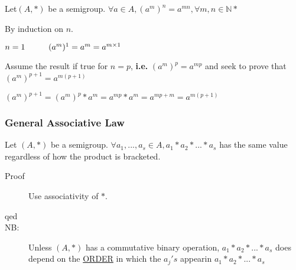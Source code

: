 \documentclass[10pt]{article}
\begin{document}
\begin{description}
\begin{description}
		\end{description}
		\item[Theorem:] Let$(A, *)$ be a semigroup. $\forall a \in A, (a^m)^n = a^{mn}, \forall m, n \in \mathbb{N}*$
		\begin{description}
			\item[Proof:] By induction on $n$.
			\item[Base Case:] $n=1 \hspace{10mm} (a^m)^1 = a^m = a^{m \times 1}$
			\item[Inductive Step:] Assume the result if true for $n=p$, \textbf{i.e.} $(a^m)^p = a^{mp}$ and seek to prove that $(a^m)^{p+1}=a^{m(p+1)}$
			\item $(a^m)^{p+1} = (a^m)^p * a^m = a^{mp} * a^m = a^{mp+m} = a^{m(p+1)}$
		\end{description}
	\end{description}
	
	\subsubsection{General Associative Law}
	Let $(A, *)$ be a semigroup. $\forall a_1, ..., a_s \in A, a_1 * a_2 * ... * a_s$ has the same value regardless of how the product is bracketed.
	\begin{description}
		\item[Proof] Use associativity of $*$.
		\item[qed]
		\item[NB:] Unless $(A, *)$ has a commutative binary operation, $a_1 * a_2 * ... * a_s$ does depend on the \underline{ORDER} in which the $a_j's$ appearin $a_1 * a_2 * ... * a_s$
	\end{description}
	
\end{document}
